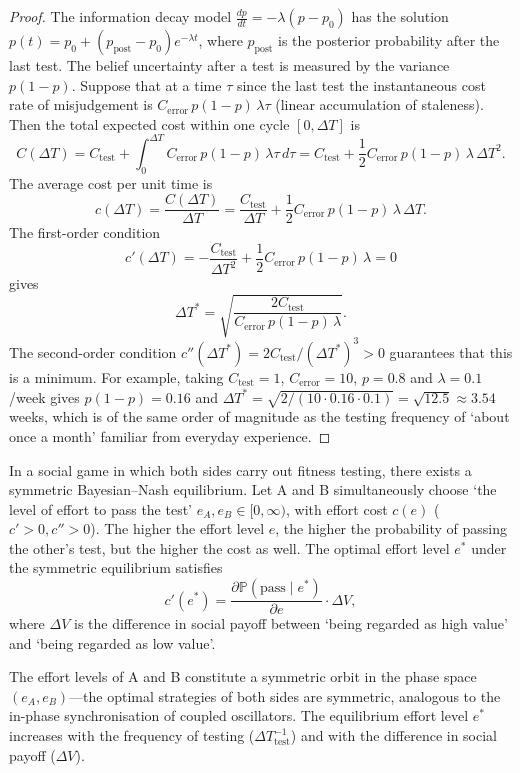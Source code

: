 \begin{proof}
The information decay model $\frac{dp}{dt} = -\lambda(p-p_0)$ has the solution $p(t) = p_0 + (p_{\text{post}}-p_0)e^{-\lambda t}$, where $p_{\text{post}}$ is the posterior probability after the last test. The belief uncertainty after a test is measured by the variance $p(1-p)$. Suppose that at a time $\tau$ since the last test the instantaneous cost rate of misjudgement is $C_{\text{error}}\,p(1-p)\,\lambda\tau$ (linear accumulation of staleness). Then the total expected cost within one cycle $[0,\Delta T]$ is
\[
C(\Delta T) = C_{\text{test}} + \int_0^{\Delta T} C_{\text{error}}\,p(1-p)\,\lambda\tau\,d\tau
= C_{\text{test}} + \frac12 C_{\text{error}}\,p(1-p)\,\lambda\,\Delta T^2.
\]
The average cost per unit time is
\[
c(\Delta T) = \frac{C(\Delta T)}{\Delta T} = \frac{C_{\text{test}}}{\Delta T} + \frac12 C_{\text{error}}\,p(1-p)\,\lambda\,\Delta T.
\]
The first-order condition
\[
c'(\Delta T) = -\frac{C_{\text{test}}}{\Delta T^2} + \frac12 C_{\text{error}}\,p(1-p)\,\lambda = 0
\]
gives
\[
\Delta T^* = \sqrt{\frac{2C_{\text{test}}}{C_{\text{error}}\,p(1-p)\,\lambda}}.
\]
The second-order condition $c''(\Delta T^*) = 2C_{\text{test}}/(\Delta T^*)^3 > 0$ guarantees that this is a minimum. For example, taking $C_{\text{test}}=1$, $C_{\text{error}}=10$, $p=0.8$ and $\lambda = 0.1$/week gives $p(1-p)=0.16$ and $\Delta T^* = \sqrt{2/(10\cdot 0.16\cdot 0.1)} = \sqrt{12.5} \approx 3.54$ weeks, which is of the same order of magnitude as the testing frequency of `about once a month' familiar from everyday experience.
\end{proof}

\begin{theorem}\label{thm:shittest_nash}
In a social game in which both sides carry out fitness testing, there exists a symmetric Bayesian--Nash equilibrium. Let A and B simultaneously choose `the level of effort to pass the test' $e_A, e_B \in [0, \infty)$, with effort cost $c(e)$ ($c' > 0, c'' > 0$). The higher the effort level $e$, the higher the probability of passing the other's test, but the higher the cost as well. The optimal effort level $e^*$ under the symmetric equilibrium satisfies
\[
c'(e^*) = \frac{\partial \mathbb{P}(\text{pass} \mid e^*)}{\partial e} \cdot \Delta V,
\]
where $\Delta V$ is the difference in social payoff between `being regarded as high value' and `being regarded as low value'.

The effort levels of A and B constitute a symmetric orbit in the phase space $(e_A, e_B)$---the optimal strategies of both sides are symmetric, analogous to the in-phase synchronisation of coupled oscillators. The equilibrium effort level $e^*$ increases with the frequency of testing ($\Delta T_{\text{test}}^{-1}$) and with the difference in social payoff ($\Delta V$).
\end{theorem}

